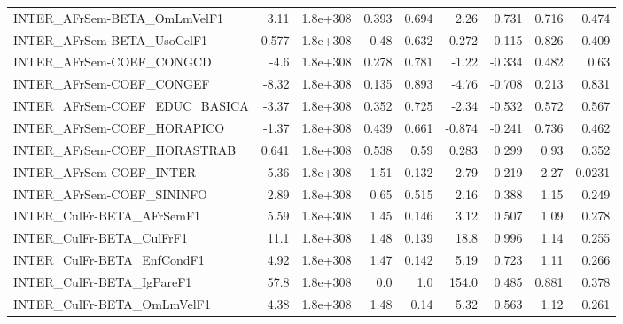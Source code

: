 \begin{tabular}{lrrrrrrrr}
INTER\_AFrSem-BETA\_OmLmVelF1           &        3.11 &     1.8e+308 &   0.393 &    0.694 &       2.26 &       0.731 &        0.716 &         0.474 \\
INTER\_AFrSem-BETA\_UsoCelF1            &       0.577 &     1.8e+308 &    0.48 &    0.632 &      0.272 &       0.115 &        0.826 &         0.409 \\
INTER\_AFrSem-COEF\_CONGCD              &        -4.6 &     1.8e+308 &   0.278 &    0.781 &      -1.22 &      -0.334 &        0.482 &          0.63 \\
INTER\_AFrSem-COEF\_CONGEF              &       -8.32 &     1.8e+308 &   0.135 &    0.893 &      -4.76 &      -0.708 &        0.213 &         0.831 \\
INTER\_AFrSem-COEF\_EDUC\_BASICA         &       -3.37 &     1.8e+308 &   0.352 &    0.725 &      -2.34 &      -0.532 &        0.572 &         0.567 \\
INTER\_AFrSem-COEF\_HORAPICO            &       -1.37 &     1.8e+308 &   0.439 &    0.661 &     -0.874 &      -0.241 &        0.736 &         0.462 \\
INTER\_AFrSem-COEF\_HORASTRAB           &       0.641 &     1.8e+308 &   0.538 &     0.59 &      0.283 &       0.299 &         0.93 &         0.352 \\
INTER\_AFrSem-COEF\_INTER               &       -5.36 &     1.8e+308 &    1.51 &    0.132 &      -2.79 &      -0.219 &         2.27 &        0.0231 \\
INTER\_AFrSem-COEF\_SININFO             &        2.89 &     1.8e+308 &    0.65 &    0.515 &       2.16 &       0.388 &         1.15 &         0.249 \\
INTER\_CulFr-BETA\_AFrSemF1             &        5.59 &     1.8e+308 &    1.45 &    0.146 &       3.12 &       0.507 &         1.09 &         0.278 \\
INTER\_CulFr-BETA\_CulFrF1              &        11.1 &     1.8e+308 &    1.48 &    0.139 &       18.8 &       0.996 &         1.14 &         0.255 \\
INTER\_CulFr-BETA\_EnfCondF1            &        4.92 &     1.8e+308 &    1.47 &    0.142 &       5.19 &       0.723 &         1.11 &         0.266 \\
INTER\_CulFr-BETA\_IgPareF1             &        57.8 &     1.8e+308 &     0.0 &      1.0 &      154.0 &       0.485 &        0.881 &         0.378 \\
INTER\_CulFr-BETA\_OmLmVelF1            &        4.38 &     1.8e+308 &    1.48 &     0.14 &       5.32 &       0.563 &         1.12 &         0.261 \\

\end{tabular}
